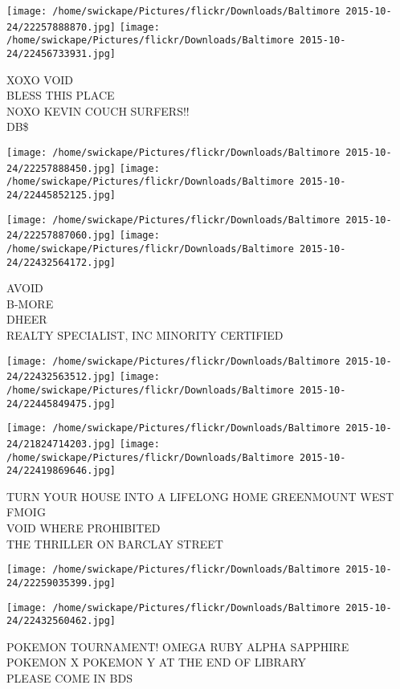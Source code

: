 \documentclass[10pt,letterpaper]{article}
\begin{document}
\texttt{[image: /home/swickape/Pictures/flickr/Downloads/Baltimore 2015-10-24/22257888870.jpg]}
\texttt{[image: /home/swickape/Pictures/flickr/Downloads/Baltimore 2015-10-24/22456733931.jpg]}

XOXO VOID\\
BLESS THIS PLACE\\
NOXO KEVIN COUCH SURFERS!!\\
DB\$\\
\pagebreak

\texttt{[image: /home/swickape/Pictures/flickr/Downloads/Baltimore 2015-10-24/22257888450.jpg]}
\texttt{[image: /home/swickape/Pictures/flickr/Downloads/Baltimore 2015-10-24/22445852125.jpg]}

\texttt{[image: /home/swickape/Pictures/flickr/Downloads/Baltimore 2015-10-24/22257887060.jpg]}
\texttt{[image: /home/swickape/Pictures/flickr/Downloads/Baltimore 2015-10-24/22432564172.jpg]}

AVOID\\
B{-}MORE\\
DHEER\\
REALTY SPECIALIST, INC MINORITY CERTIFIED\\
\pagebreak

\texttt{[image: /home/swickape/Pictures/flickr/Downloads/Baltimore 2015-10-24/22432563512.jpg]}
\texttt{[image: /home/swickape/Pictures/flickr/Downloads/Baltimore 2015-10-24/22445849475.jpg]}

\texttt{[image: /home/swickape/Pictures/flickr/Downloads/Baltimore 2015-10-24/21824714203.jpg]}
\texttt{[image: /home/swickape/Pictures/flickr/Downloads/Baltimore 2015-10-24/22419869646.jpg]}

TURN YOUR HOUSE INTO A LIFELONG HOME GREENMOUNT WEST\\
FMOIG\\
VOID WHERE PROHIBITED\\
THE THRILLER ON BARCLAY STREET\\
\pagebreak

\texttt{[image: /home/swickape/Pictures/flickr/Downloads/Baltimore 2015-10-24/22259035399.jpg]}

\vspace{0.25in}
\texttt{[image: /home/swickape/Pictures/flickr/Downloads/Baltimore 2015-10-24/22432560462.jpg]}

POKEMON TOURNAMENT!  OMEGA RUBY ALPHA SAPPHIRE POKEMON X POKEMON Y AT THE END OF LIBRARY\\
PLEASE COME IN BDS\\
\pagebreak
\end{document}
